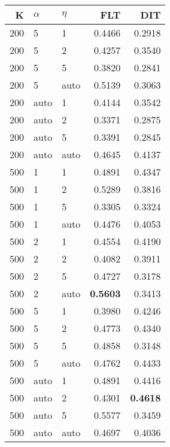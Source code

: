 \begin{table}
\begin{spacing}{1.2}
{\begin{tabular}{rll|rr}
\bottomrule
\end{tabular}
} \hfill \parbox{.45\linewidth}{\centering \begin{tabular}{rll|rr}
\toprule
   K & $\alpha$ &   $\eta$ & FLT &       DIT \\
\midrule
 200 &     5 &     1 &           0.4466 &       0.2918 \\
 200 &     5 &     2 &           0.4257 &       0.3540 \\
 200 &     5 &     5 &           0.3820 &       0.2841 \\
 200 &     5 &  auto &           0.5139 &       0.3063 \\
 200 &  auto &     1 &           0.4144 &       0.3542 \\
 200 &  auto &     2 &           0.3371 &       0.2875 \\
 200 &  auto &     5 &           0.3391 &       0.2845 \\
 200 &  auto &  auto &           0.4645 &       0.4137 \\
 500 &     1 &     1 &           0.4891 &       0.4347 \\
 500 &     1 &     2 &           0.5289 &       0.3816 \\
 500 &     1 &     5 &           0.3305 &       0.3324 \\
 500 &     1 &  auto &           0.4476 &       0.4053 \\
 500 &     2 &     1 &           0.4554 &       0.4190 \\
 500 &     2 &     2 &           0.4082 &       0.3911 \\
 500 &     2 &     5 &           0.4727 &       0.3178 \\
 500 &     2 &  auto &     {\bf 0.5603} &       0.3413 \\
 500 &     5 &     1 &           0.3980 &       0.4246 \\
 500 &     5 &     2 &           0.4773 &       0.4340 \\
 500 &     5 &     5 &           0.4858 &       0.3148 \\
 500 &     5 &  auto &           0.4762 &       0.4433 \\
 500 &  auto &     1 &           0.4891 &       0.4416 \\
 500 &  auto &     2 &           0.4301 & {\bf 0.4618} \\
 500 &  auto &     5 &           0.5577 &       0.3459 \\
 500 &  auto &  auto &           0.4697 &       0.4036 \\
\bottomrule
\end{tabular}
}
\end{spacing}
\end{table}
